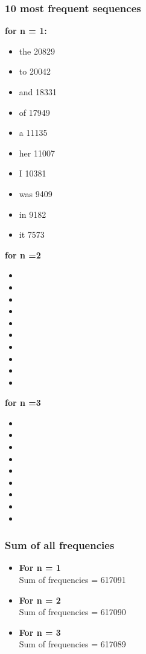 \documentclass[final,12pt]{elsarticle}
\begin{document}
\subsubsection{10 most frequent sequences}
\textbf{for n = 1:}
\begin{itemize}
\item the 20829
\item to 20042
\item and 18331 
\item of 17949
\item a 11135
\item her 11007
\item I 10381
\item was 9409
\item in 9182 
\item it 7573
\end{itemize}
\textbf{for n =2}
\begin{itemize}
\item 
\item 
\item 
\item 
\item 
\item 
\item 
\item 
\item 
\item 
\end{itemize}
\textbf{for n =3}
\begin{itemize}
\item 
\item
\item
\item
\item
\item
\item
\item
\item
\end{itemize}
\subsubsection{Sum of all frequencies}
\begin{itemize}
\item \textbf{For n = 1}\\
Sum of frequencies = 617091
\item \textbf{For n = 2}\\
Sum of frequencies = 617090
\item \textbf{For n = 3}\\
Sum of frequencies = 617089
\end{itemize}
\end{document}
